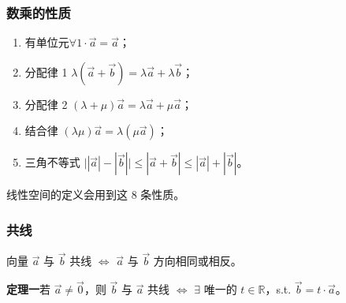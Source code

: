 \documentclass[UTF8,11pt]{ctexart}
\theoremstyle{cnthm}
\begin{document}
\subsubsection*{数乘的性质}

\begin{enumerate}
\item[5.] 有单位元\quad $\forall 1\cdot\vec a=\vec a$；
\item[6.] 分配律 1\quad
$\lambda(\vec a+\vec b)=\lambda\vec a+\lambda\vec b$；
\item[7.] 分配律 2\quad
$(\lambda+\mu)\vec a=\lambda\vec a+\mu\vec a$；
\item[8.] 结合律\quad
$(\lambda\mu)\vec a=\lambda(\mu\vec a)$；
\item[9.] 三角不等式\quad
$\bigl||\vec a|-|\vec b|\bigr|\leq|\vec a+\vec b|
\leq|\vec a|+|\vec b|$。
\end{enumerate}

线性空间的定义会用到这 8 条性质。

\subsubsection*{共线}

向量 $\vec a$ 与 $\vec b$ 共线 $\Longleftrightarrow$
$\vec a$ 与 $\vec b$ 方向相同或相反。

\textbf{定理一}\quad 若 $\vec a\neq\vec 0$，则 $\vec b$ 与
$\vec a$ 共线 $\Longleftrightarrow$ $\exists$ 唯一的
$t\in\mathbb R$，s.t. $\vec b=t\cdot\vec a$。
\end{document}
